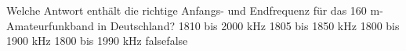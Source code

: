     {Welche Antwort enthält die richtige Anfangs- und Endfrequenz für das 160 m-Amateurfunkband in Deutschland?}
    {1810 bis 2000 kHz}
    {1805 bis 1850 kHz}
    {1800 bis 1900 kHz}
    {1800 bis 1990 kHz}
    {false}{false}